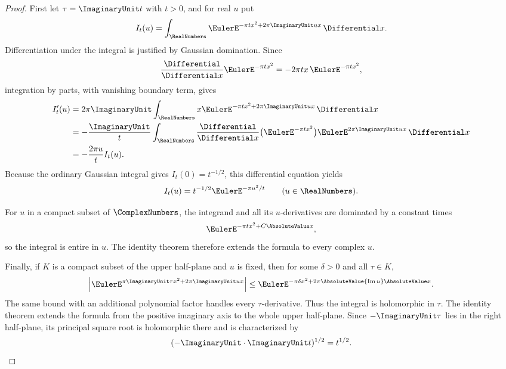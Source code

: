 \begin{proof}
First let $\tau=\ImaginaryUnit t$ with $t>0$, and for real $u$ put
\[
 I_t(u)=\int_{\RealNumbers}
 \EulerE^{-\pi t x^2+2\pi\ImaginaryUnit ux}\,\Differential x.
\]
Differentiation under the integral is justified by Gaussian domination.  Since
\[
 \frac{\Differential}{\Differential x}\EulerE^{-\pi t x^2}
 =-2\pi t x\,\EulerE^{-\pi t x^2},
\]
integration by parts, with vanishing boundary term, gives
\begin{align*}
 I_t'(u)
 &=2\pi\ImaginaryUnit\int_{\RealNumbers}
   x\EulerE^{-\pi t x^2+2\pi\ImaginaryUnit ux}\,\Differential x\\
 &=-\frac{\ImaginaryUnit}{t}
   \int_{\RealNumbers}
   \frac{\Differential}{\Differential x}
   \bigl(\EulerE^{-\pi t x^2}\bigr)
   \EulerE^{2\pi\ImaginaryUnit ux}\,\Differential x\\
 &=-\frac{2\pi u}{t}I_t(u).
\end{align*}
Because the ordinary Gaussian integral gives $I_t(0)=t^{-1/2}$, this
differential equation yields
\[
 I_t(u)=t^{-1/2}\EulerE^{-\pi u^2/t}
 \qquad (u\in\RealNumbers).
\]

For $u$ in a compact subset of $\ComplexNumbers$, the integrand and all its
$u$-derivatives are dominated by a constant times
\[
 \EulerE^{-\pi t x^2+C\AbsoluteValue x},
\]
so the integral is entire in $u$.  The identity theorem therefore extends the
formula to every complex $u$.

Finally, if $K$ is a compact subset of the upper half-plane and $u$ is fixed,
then for some $\delta>0$ and all $\tau\in K$,
\[
 \left|
 \EulerE^{\pi\ImaginaryUnit\tau x^2+2\pi\ImaginaryUnit ux}
 \right|
 \le
 \EulerE^{-\pi\delta x^2+2\pi\AbsoluteValue{\operatorname{Im}u}
                    \AbsoluteValue x}.
\]
The same bound with an additional polynomial factor handles every
$\tau$-derivative.  Thus the integral is holomorphic in $\tau$.  The identity
theorem extends the formula from the positive imaginary axis to the whole
upper half-plane.  Since $-\ImaginaryUnit\tau$ lies in the right half-plane,
its principal square root is holomorphic there and is characterized by
\[
 (-\ImaginaryUnit\cdot\ImaginaryUnit t)^{1/2}=t^{1/2}.
\]
\end{proof}

